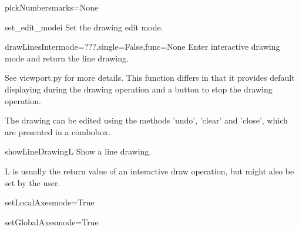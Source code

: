 \begin{funcdesc}{pickNumbers}{marks=None}


\end{funcdesc}


\begin{funcdesc}{set_edit_mode}{i}
Set the drawing edit mode.

\end{funcdesc}


\begin{funcdesc}{drawLinesInter}{mode=???,single=False,func=None}
Enter interactive drawing mode and return the line drawing.

    See viewport.py for more details.
    This function differs in that it provides default displaying
    during the drawing operation and a button to stop the drawing operation.

    The drawing can be edited using the methods 'undo', 'clear' and 'close', which
    are presented in a combobox.
    

\end{funcdesc}


\begin{funcdesc}{showLineDrawing}{L}
Show a line drawing.

    L is usually the return value of an interactive draw operation, but
    might also be set by the user.
    

\end{funcdesc}


\begin{funcdesc}{setLocalAxes}{mode=True}


\end{funcdesc}


\begin{funcdesc}{setGlobalAxes}{mode=True}


\end{funcdesc}



